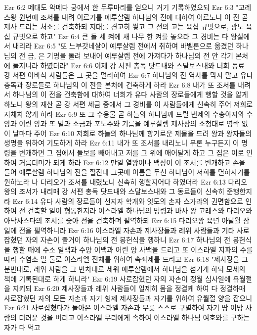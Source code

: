 Ezr 6:2  메대도 악메다 궁에서 한 두루마리를 얻으니 거기 기록하였으되
Ezr 6:3  "고레스왕 원년에 조서를 내려 이르기를 예루살렘 하나님의 전에 대하여 이르노니 이 전 곧 제사 드리는 처소를 건축하되 지대를 견고히 쌓고 그 전의 고는 육십 규빗으로, 광도 육십 규빗으로 하고"
Ezr 6:4  큰 돌 세 켜에 새 나무 한 켜를 놓으라 그 경비는 다 왕실에서 내리라
Ezr 6:5  "또 느부갓네살이 예루살렘 전에서 취하여 바벨론으로 옮겼던 하나님의 전 금, 은 기명을 돌려 보내어 예루살렘 전에 가져다가 하나님의 전 안 각기 본처에 둘지니라 하였더라"
Ezr 6:6  이제 강 서편 총독 닷드내와 스달보스내와 너희 동료 강 서편 아바삭 사람들은 그 곳을 멀리하여
Ezr 6:7  하나님의 전 역사를 막지 말고 유다 총독과 장로들로 하나님의 이 전을 본처에 건축하게 하라
Ezr 6:8  내가 또 조서를 내려서 하나님의 이 전을 건축함에 대하여 너희가 유다 사람의 장로들에게 행할 것을 알게 하노니 왕의 재산 곧 강 서편 세금 중에서 그 경비를 이 사람들에게 신속히 주어 저희로 지체치 않게 하라
Ezr 6:9  또 그 수용물 곧 하늘의 하나님께 드릴 번제의 수송아지와 수양과 어린 양과 또 밀과 소금과 포도주와 기름을 예루살렘 제사장의 소청대로 영락 없이 날마다 주어
Ezr 6:10  저희로 하늘의 하나님께 향기로운 제물을 드려 왕과 왕자들의 생명을 위하여 기도하게 하라
Ezr 6:11  내가 또 조서를 내리노니 무론 누구든지 이 명령을 변개하면 그 집에서 들보를 빼어내고 저를 그 위에 매어달게 하고 그 집은 이로 인하여 거름더미가 되게 하라
Ezr 6:12  만일 열왕이나 백성이 이 조서를 변개하고 손을 들어 예루살렘 하나님의 전을 헐진대 그곳에 이름을 두신 하나님이 저희를 멸하시기를 원하노라 나 다리오가 조서를 내렸노니 신속히 행할지어다 하였더라
Ezr 6:13  다리오왕의 조서가 내리매 강 서편 총독 닷드내와 스달보스내와 그 동료들이 신속히 준행한지라
Ezr 6:14  유다 사람의 장로들이 선지자 학개와 잇도의 손자 스가랴의 권면함으로 인하여 전 건축할 일이 형통한지라 이스라엘 하나님의 명령과 바사 왕 고레스와 다리오와 아닥사스다의 조서를 좇아 전을 건축하며 필역하되
Ezr 6:15  다리오왕 육년 아달월 삼일에 전을 필역하니라
Ezr 6:16  이스라엘 자손과 제사장들과 레위 사람들과 기타 사로잡혔던 자의 자손이 즐거이 하나님의 전 봉헌식을 행하니
Ezr 6:17  하나님의 전 봉헌식을 행할 때에 수소 일백과 수양 이백과 어린 양 사백을 드리고 또 이스라엘 지파의 수를 따라 수염소 열 둘로 이스라엘 전체를 위하여 속죄제를 드리고
Ezr 6:18  "제사장을 그 분반대로, 레위 사람을 그 반차대로 세워 예루살렘에서 하나님을 섬기게 하되 모세의 책에 기록된대로 하게 하니라"
Ezr 6:19  사로잡혔던 자의 자손이 정월 십사일에 유월절을 지키되
Ezr 6:20  제사장들과 레위 사람들이 일제히 몸을 정결케 하여 다 정결하매 사로잡혔던 자의 모든 자손과 자기 형제 제사장들과 자기를 위하여 유월절 양을 잡으니
Ezr 6:21  사로잡혔다가 돌아온 이스라엘 자손과 무릇 스스로 구별하여 자기 땅 이방 사람의 더러운 것을 버리고 이스라엘 무리에게 속하여 이스라엘 하나님 여호와를 구하는 자가 다 먹고
